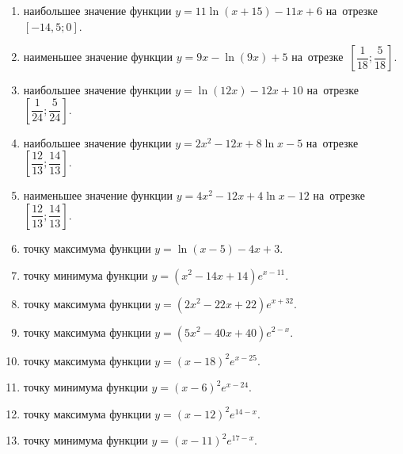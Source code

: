 \documentclass[a4paper,10pt]{article}
\begin{document}
\begin{enumerate}
\item {} наибольшее значение функции $y = 11\ln \left(x+15\right)-11x +6$ на~отрезке~$\left[-14,5;0\right]$.

\item {} наименьшее значение функции $y = 9x-\ln \left(9x\right)+5$ на~отрезке~$\left[\dfrac{1}{18};\dfrac{5}{18}\right]$.







\item {} наибольшее значение функции $y = \ln \left(12x\right)-12x+10$ на~отрезке~$\left[\dfrac{1}{24};\dfrac{5}{24}\right]$.







\item {} наибольшее значение функции $y=2x^2-12x+8\ln x-5$ на~отрезке~$\left[\dfrac{12}{13};\dfrac{14}{13}\right]$.

\item {} наименьшее значение функции $y=4x^2-12x+4\ln x-12$ на~отрезке~$\left[\dfrac{12}{13};\dfrac{14}{13}\right]$.

\item {} точку максимума функции $y=\ln \left(x-5\right)-4x+3$.

\item {} точку минимума функции $y=\left(x^2-14x+14\right)e^{x-11}$.

\item {} точку максимума функции $y=\left(2x^2-22x+22\right)e^{x+32}$.

\item {} точку максимума функции $y=\left(5x^2-40x+40\right)e^{2-x}$.

\item {} точку максимума функции $y=\left(x -18\right)^2e^{x-25}$.

\item {} точку минимума функции $y=\left(x -6\right)^2e^{x-24}$.

\item {} точку максимума функции $y=\left(x -12\right)^2e^{14-x}$.

\item {} точку минимума функции $y=\left(x -11\right)^2e^{17-x}$.


\end{enumerate}
\end{document}
